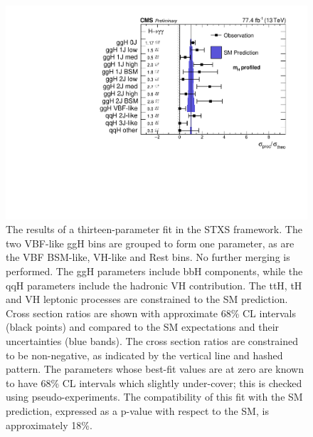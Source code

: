 {\begin{figure}[hptb]
\centering
\includegraphics[width=\textwidth]{Figures/Results/Stage1Min.pdf}
\caption{
  The results of a thirteen-parameter fit in the STXS framework. 
  The two VBF-like ggH bins are grouped to form one parameter, 
  as are the VBF BSM-like, VH-like and Rest bins.
  No further merging is performed. 
  The ggH parameters include bbH components, 
  while the qqH parameters include the hadronic VH contribution. 
  The ttH, tH and VH leptonic processes are constrained to the SM prediction. 
  Cross section ratios are shown with approximate 68\% CL intervals (black points) 
  and compared to the SM expectations and their uncertainties (blue bands). 
  The cross section ratios are constrained to be non-negative, 
  as indicated by the vertical line and hashed pattern. 
  The parameters whose best-fit values are at zero are known to have 68\% CL intervals 
  which slightly under-cover; this is checked using pseudo-experiments. 
  The compatibility of this fit with the SM prediction, 
  expressed as a p-value with respect to the SM, is approximately 18\%.
}
\label{fig:results_Stage1Min}
\end{figure}


}
